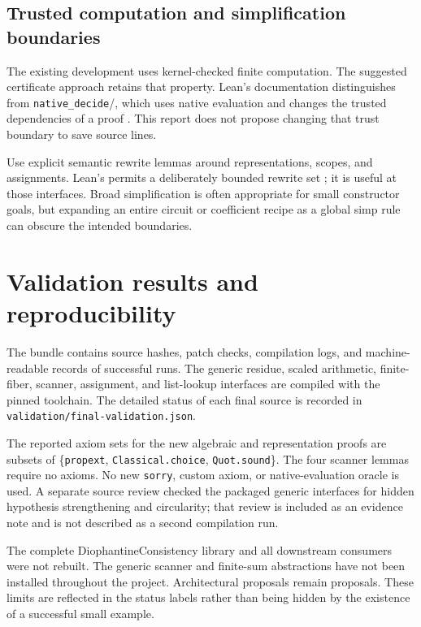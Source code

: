 \documentclass[11pt,letterpaper]{article}
\newcommand{\code}[1]{\nolinkurl{#1}}
\begin{document}
\subsection{Trusted computation and simplification boundaries}

The existing development uses kernel-checked finite computation. The suggested
certificate approach retains that property. Lean's documentation distinguishes
\texttt{} from \code{native_decide}/\texttt{}, which
uses native evaluation and changes the trusted dependencies of a proof
\cite{lean-tactics,lean-validate}. This report does not propose changing that
trust boundary to save source lines.

Use explicit semantic rewrite lemmas around representations, scopes, and
assignments. Lean's \texttt{} permits a deliberately bounded rewrite set
\cite{lean-simp}; it is useful at those interfaces. Broad simplification is
often appropriate for small constructor goals, but expanding an entire circuit
or coefficient recipe as a global simp rule can obscure the intended boundaries.

\section{Validation results and reproducibility}

The bundle contains source hashes, patch checks, compilation logs, and
machine-readable records of successful runs. The generic residue, scaled
arithmetic, finite-fiber, scanner, assignment, and list-lookup interfaces are
compiled with the pinned toolchain. The detailed status of each final source
is recorded in \code{validation/final-validation.json}.

The reported axiom sets for the new algebraic and representation proofs are
subsets of \{\code{propext}, \code{Classical.choice}, \code{Quot.sound}\}.
The four scanner lemmas require no axioms. No new \code{sorry}, custom axiom,
or native-evaluation oracle is used. A separate source review checked the
packaged generic interfaces for hidden hypothesis strengthening and circularity;
that review is included as an evidence note and is not described as a second
compilation run.

The complete DiophantineConsistency library and all downstream consumers were
not rebuilt. The generic scanner and finite-sum abstractions have not been
installed throughout the project. Architectural proposals remain proposals.
These limits are reflected in the status labels rather than being hidden by
the existence of a successful small example.
\end{document}

